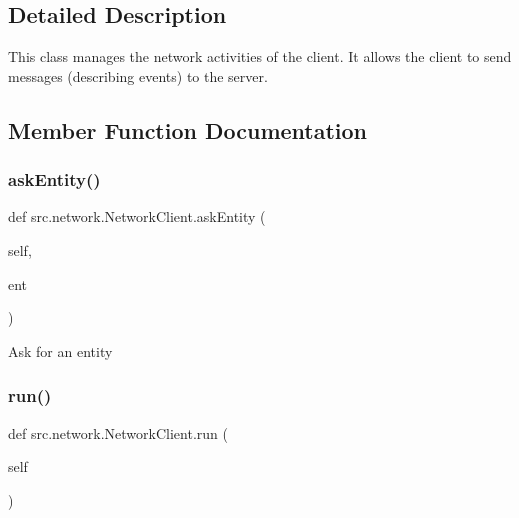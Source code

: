 \subsection{Detailed Description}
\begin{DoxyVerb}This class manages the network activities of the client.
It allows the client to send messages (describing events) to the server.
\end{DoxyVerb}
 

\subsection{Member Function Documentation}
\hypertarget{classsrc_1_1network_1_1_network_client_a284788cf59342797e77659bbf1f01077}{}\label{classsrc_1_1network_1_1_network_client_a284788cf59342797e77659bbf1f01077} 
\subsubsection{\texorpdfstring{ask\+Entity()}{askEntity()}}
{\footnotesize\ttfamily def src.\+network.\+Network\+Client.\+ask\+Entity (\begin{DoxyParamCaption}\item[{}]{self,  }\item[{}]{ent }\end{DoxyParamCaption})}

\begin{DoxyVerb}Ask for an entity \end{DoxyVerb}
 \hypertarget{classsrc_1_1network_1_1_network_client_ab93bfbf5db5822ecb056aa4ed70b9378}{}\label{classsrc_1_1network_1_1_network_client_ab93bfbf5db5822ecb056aa4ed70b9378} 
\subsubsection{\texorpdfstring{run()}{run()}}
{\footnotesize\ttfamily def src.\+network.\+Network\+Client.\+run (\begin{DoxyParamCaption}\item[{}]{self }\end{DoxyParamCaption})}

